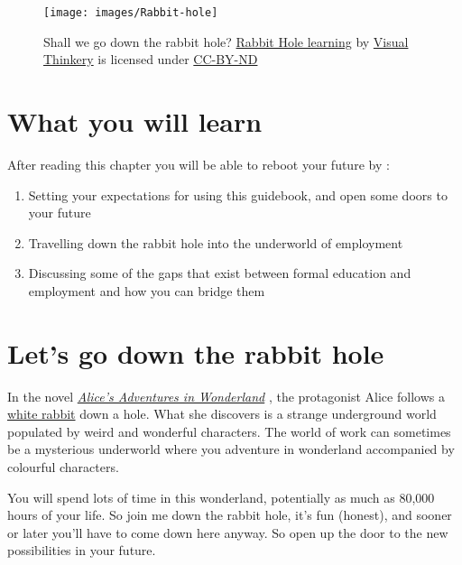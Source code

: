 \documentclass[
]{book}
\providecommand{\tightlist}{%
  \setlength{\itemsep}{0pt}\setlength{\parskip}{0pt}}
\begin{document}
\begin{figure}

{\centering \texttt{[image: images/Rabbit-hole]} 

}

\caption{Shall we go down the rabbit hole? \href{https://bryanmmathers.com/rabbit-hole-learning/}{Rabbit Hole learning} by \href{https://visualthinkery.com}{Visual Thinkery} is licensed under \href{https://creativecommons.org/licenses/by-nd/4.0/}{CC-BY-ND}}\label{fig:rabbit-fig}
\end{figure}



\hypertarget{ilo1}{%
\section{What you will learn}\label{ilo1}}

After reading this chapter you will be able to reboot your future by :

\begin{enumerate}
\def\labelenumi{\arabic{enumi}.}
\tightlist
\item
  Setting your expectations for using this guidebook, and open some doors to your future
\item
  Travelling down the rabbit hole into the underworld of employment
\item
  Discussing some of the gaps that exist between formal education and employment and how you can bridge them
\end{enumerate}

\hypertarget{wonderland}{%
\section{Let's go down the rabbit hole}\label{wonderland}}

In the novel \emph{\href{https://en.wikipedia.org/wiki/Alice\%27s_Adventures_in_Wonderland}{Alice's Adventures in Wonderland}} \citep{wonderland}, the protagonist Alice follows a \href{https://en.wikipedia.org/wiki/White_Rabbit}{white rabbit} down a hole. What she discovers is a strange underground world populated by weird and wonderful characters. The world of work can sometimes be a mysterious underworld where you adventure in wonderland accompanied by colourful characters.

You will spend lots of time in this wonderland, potentially as much as 80,000 hours of your life. \citep{iip1, iip2} So join me down the rabbit hole, it's fun (honest), and sooner or later you'll have to come down here anyway. So open up the door to the new possibilities in your future.
\end{document}
